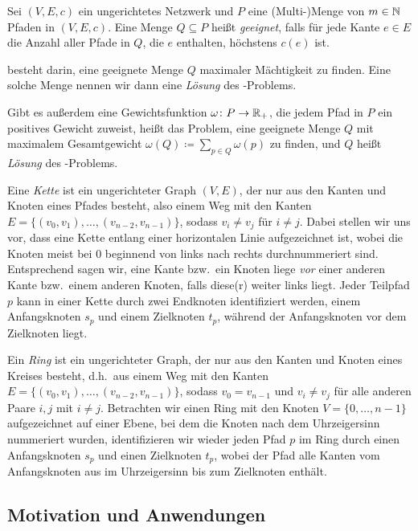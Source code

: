\begin{definition}
    Sei $(V,E,c)$ ein ungerichtetes Netzwerk und $P$ eine (Multi-)Menge von $m \in \mathbb N$ Pfaden in $(V,E,c)$.
    Eine Menge $Q \subseteq P$ heißt {\em geeignet}, falls für jede Kante $e \in E$ die Anzahl aller Pfade in $Q$,
    die $e$ enthalten, höchstens $c(e)$ ist.
    
    {\em \CallControl} besteht darin, eine geeignete Menge $Q$ maximaler Mächtigkeit zu finden.
    Eine solche Menge nennen wir dann eine {\em Lösung} des \CallControl-Problems.
    
    Gibt es außerdem eine Gewichtsfunktion $\omega \colon P \rightarrow \mathbb R_+$, die jedem Pfad in $P$ ein 
    positives Gewicht zuweist, heißt das Problem, eine geeignete Menge $Q$ mit maximalem Gesamtgewicht
    $\omega(Q) \coloneqq \sum_{p \in Q} \omega(p)$ zu finden, {\em \WeightedCallControl} und $Q$ heißt 
    {\em Lösung} des \WeightedCallControl-Problems.
\end{definition}

Eine {\em Kette} ist ein ungerichteter Graph $(V,E)$, der nur aus den Kanten und Knoten eines Pfades besteht, also einem
Weg mit den Kanten $E=\{(v_0, v_1),\dots,(v_{n-2},v_{n-1})\}$, sodass $v_i \neq v_j$ für $i \neq j$.
Dabei stellen wir uns vor, dass eine Kette entlang einer horizontalen Linie aufgezeichnet ist, wobei die
Knoten meist bei $0$ beginnend von links nach rechts durchnummeriert sind. Entsprechend sagen wir, eine Kante bzw.\ ein Knoten 
liege {\em vor} einer anderen Kante bzw.\ einem anderen Knoten, falls diese(r) weiter links liegt.
Jeder Teilpfad $p$ kann in einer Kette durch zwei Endknoten identifiziert werden, einem Anfangsknoten $s_p$ und einem 
Zielknoten $t_p$, während der Anfangsknoten vor dem Zielknoten liegt.

Ein {\em Ring} ist ein ungerichteter Graph, der nur aus den Kanten und Knoten eines Kreises besteht, d.h.\ aus einem Weg 
mit den Kanten $E=\{(v_0, v_1),\dots,(v_{n-2},v_{n-1})\}$, sodass $v_0 = v_{n-1}$ und $v_i \neq v_j$ für alle anderen Paare $i,j$ 
mit $i \neq j$.
Betrachten wir einen Ring mit den Knoten $V=\{0, \dots , n-1\}$ aufgezeichnet auf einer Ebene, bei dem die Knoten nach
dem Uhrzeigersinn nummeriert wurden, identifizieren wir wieder jeden Pfad $p$ im Ring durch einen Anfangsknoten $s_p$ und einen Zielknoten 
$t_p$, wobei der Pfad alle Kanten vom Anfangsknoten aus im Uhrzeigersinn bis zum Zielknoten enthält.

\subsection{Motivation und Anwendungen}\label{subsec:motivationUndAnwendungen}

